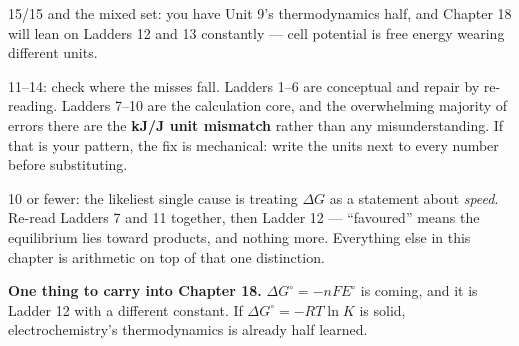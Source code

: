 \documentclass{apchem-worksheet}
\begin{document}
\begin{apcnote}
15/15 and the mixed set: you have Unit 9's thermodynamics half, and
Chapter 18 will lean on Ladders 12 and 13 constantly --- cell potential
is free energy wearing different units.

11--14: check where the misses fall. Ladders 1--6 are conceptual and
repair by re-reading. Ladders 7--10 are the calculation core, and the
overwhelming majority of errors there are the \textbf{kJ/J unit
mismatch} rather than any misunderstanding. If that is your pattern,
the fix is mechanical: write the units next to every number before
substituting.

10 or fewer: the likeliest single cause is treating $\Delta G$ as a
statement about \emph{speed}. Re-read Ladders 7 and 11 together, then
Ladder 12 --- ``favoured'' means the equilibrium lies toward products,
and nothing more. Everything else in this chapter is arithmetic on top
of that one distinction.

\textbf{One thing to carry into Chapter 18.} $\Delta G^{\circ} =
-nFE^{\circ}$ is coming, and it is Ladder 12 with a different constant.
If $\Delta G^{\circ} = -RT\ln K$ is solid, electrochemistry's
thermodynamics is already half learned.
\end{apcnote}
\end{document}
